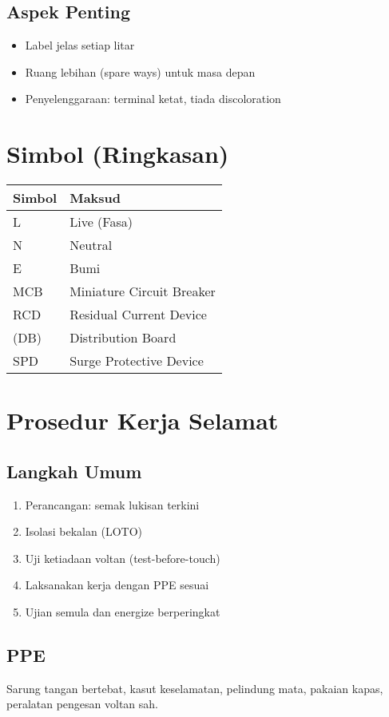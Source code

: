\documentclass[12pt,a4paper,oneside]{scrreprt}
\newcommand{\Lwire}{\textcolor{LiveColor}{L}}
\newcommand{\Nwire}{\textcolor{NeutralColor}{N}}
\newcommand{\Ewire}{\textcolor{EarthColor}{E}}
\begin{document}
\section{Aspek Penting}
\begin{itemize}
  \item Label jelas setiap litar
  \item Ruang lebihan (spare ways) untuk masa depan
  \item Penyelenggaraan: terminal ketat, tiada discoloration
\end{itemize}

\chapter{Simbol (Ringkasan)}
\begin{tabular}{ll}
\toprule
Simbol & Maksud\\
\midrule
\Lwire & Live (Fasa) \\
\Nwire & Neutral \\
\Ewire & Bumi \\
MCB & Miniature Circuit Breaker \\
RCD & Residual Current Device \\
(DB) & Distribution Board \\
SPD & Surge Protective Device \\
\bottomrule
\end{tabular}

\chapter{Prosedur Kerja Selamat}
\section{Langkah Umum}
\begin{enumerate}
  \item Perancangan: semak lukisan terkini
  \item Isolasi bekalan (LOTO)
  \item Uji ketiadaan voltan (test-before-touch)
  \item Laksanakan kerja dengan PPE sesuai
  \item Ujian semula dan energize berperingkat
\end{enumerate}

\section{PPE}
Sarung tangan bertebat, kasut keselamatan, pelindung mata, pakaian kapas, peralatan pengesan voltan sah.
\end{document}
